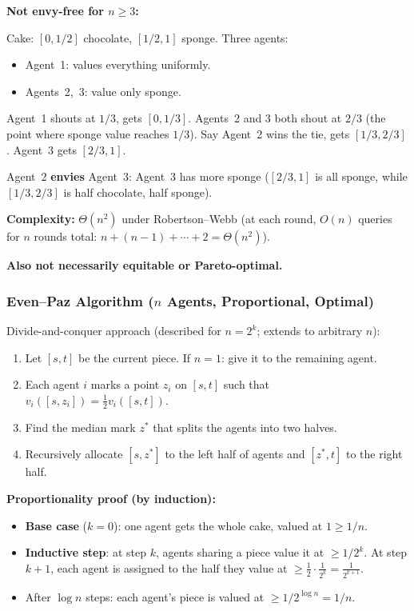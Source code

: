 \textbf{Not envy-free for $n \ge 3$:}

\begin{exbox}
Cake: $[0, 1/2]$ chocolate, $[1/2, 1]$ sponge. Three agents:
\begin{itemize}
  \item Agent~1: values everything uniformly.
  \item Agents~2,~3: value only sponge.
\end{itemize}
Agent~1 shouts at $1/3$, gets $[0, 1/3]$. Agents~2 and 3 both shout at $2/3$ (the point where sponge value reaches $1/3$). Say Agent~2 wins the tie, gets $[1/3, 2/3]$. Agent~3 gets $[2/3, 1]$.

Agent~2 \textbf{envies} Agent~3: Agent~3 has more sponge ($[2/3, 1]$ is all sponge, while $[1/3, 2/3]$ is half chocolate, half sponge).
\end{exbox}

\textbf{Complexity:} $\Theta(n^2)$ under Robertson--Webb (at each round, $O(n)$ queries for $n$ rounds total: $n + (n-1) + \cdots + 2 = \Theta(n^2)$).

\textbf{Also not necessarily equitable or Pareto-optimal.}

\separator

\subsubsection{Even--Paz Algorithm ($n$ Agents, Proportional, Optimal)}

\begin{thmbox}
Divide-and-conquer approach (described for $n = 2^k$; extends to arbitrary $n$):
\begin{enumerate}
  \item Let $[s, t]$ be the current piece. If $n = 1$: give it to the remaining agent.
  \item Each agent $i$ marks a point $z_i$ on $[s, t]$ such that $v_i([s, z_i]) = \tfrac{1}{2} v_i([s, t])$.
  \item Find the median mark $z^*$ that splits the agents into two halves.
  \item Recursively allocate $[s, z^*]$ to the left half of agents and $[z^*, t]$ to the right half.
\end{enumerate}
\end{thmbox}

\textbf{Proportionality proof (by induction):}
\begin{itemize}
  \item \textbf{Base case} ($k=0$): one agent gets the whole cake, valued at $1 \ge 1/n$.
  \item \textbf{Inductive step}: at step $k$, agents sharing a piece value it at $\ge 1/2^k$. At step $k+1$, each agent is assigned to the half they value at $\ge \tfrac{1}{2} \cdot \tfrac{1}{2^k} = \tfrac{1}{2^{k+1}}$.
  \item After $\log n$ steps: each agent's piece is valued at $\ge 1/2^{\log n} = 1/n$.
\end{itemize}

